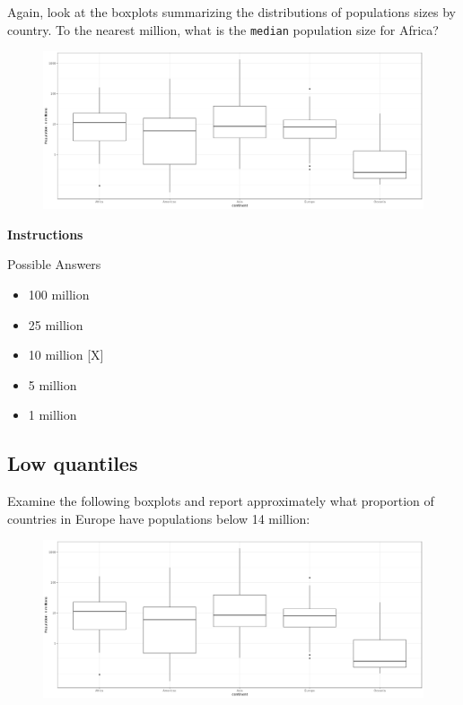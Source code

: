 \documentclass[]{article}
\providecommand{\tightlist}{%
  \setlength{\itemsep}{0pt}\setlength{\parskip}{0pt}}
\begin{document}
Again, look at the boxplots summarizing the distributions of populations
sizes by country. To the nearest million, what is the \texttt{median}
population size for Africa?

\begin{figure}
\centering
\includegraphics{img1.png}
\caption{}
\end{figure}

\textbf{Instructions}

Possible Answers

\begin{itemize}
\tightlist
\item
  100 million
\item
  25 million
\item
  10 million {[}X{]}
\item
  5 million
\item
  1 million
\end{itemize}

\subsection{\texorpdfstring{\textbf{Low
quantiles}}{Low quantiles}}\label{low-quantiles}

Examine the following boxplots and report approximately what proportion
of countries in Europe have populations below 14 million:

\begin{figure}
\centering
\includegraphics{img1.png}
\caption{}
\end{figure}
\end{document}
